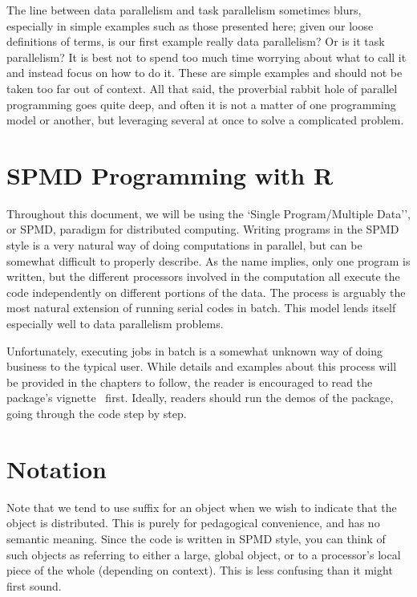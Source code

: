 The line between data parallelism and task parallelism sometimes blurs,
especially in simple examples such as those presented here; given our loose
definitions of terms, is our first example really data parallelism?  Or is
it task parallelism?  It is best not to spend too much time worrying about
what to call it and instead focus on how to do it. These are simple examples
and should not be taken too far out of context. All that said, the proverbial
rabbit hole of parallel programming goes quite deep, and often it is not a
matter of one programming model or another, but leveraging several at once
to solve a complicated problem.





\section{SPMD Programming with R}

Throughout this document, we will be using the `Single Program/Multiple Data'',
or SPMD, paradigm for distributed computing.
Writing programs in the SPMD style is a very natural way of doing
computations in parallel, but can be somewhat difficult to properly describe.
As the name implies, only one program is written, but the different processors
involved in the computation all execute the code independently on different
portions of the data. The process is arguably the most natural extension of
running serial codes in batch. This model lends itself especially well to
data parallelism problems.

Unfortunately, executing jobs in batch is a somewhat unknown way of doing
business to the typical  user. While details and examples about
this process will be provided in the chapters to follow, the reader is
encouraged to read the  package's
vignette~\citep{Chen2012pbdMPIvignette} first.  Ideally, readers should
run the demos of the  package, going through the code step by step.




\section{Notation}
\label{sec:notation}

Note that we tend to use suffix
 for an object when we wish to indicate
that the object is distributed.  This is purely for pedagogical convenience,
and has no semantic meaning. Since the code is written in SPMD style, you
can think of such objects as referring to either a large, global object, or
to a processor's local piece of the whole (depending on context).
This is less confusing than it might first sound.

